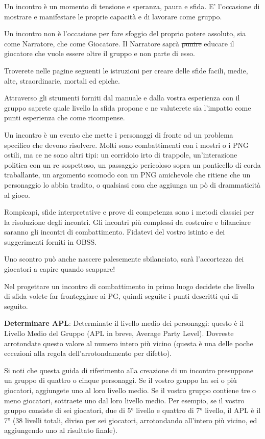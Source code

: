 \begin{multicols}{2}
\medskip

Un incontro è un momento di tensione e speranza, paura e sfida. E' l'occasione di mostrare e manifestare le proprie capacità e di lavorare come gruppo.

Un incontro non è l'occasione per fare sfoggio del proprio potere assoluto, sia come Narratore, che come Giocatore. Il Narratore saprà \st{punire} educare il giocatore che vuole essere oltre il gruppo e non parte di esso.

Troverete nelle pagine seguenti le istruzioni per creare delle sfide facili, medie, alte, straordinarie, mortali ed epiche.

Attraverso gli strumenti forniti dal manuale e dalla vostra esperienza con il gruppo saprete quale livello la sfida propone e ne valuterete sia l'impatto come punti esperienza che come ricompense.

Un incontro è un evento che mette i personaggi di fronte ad un problema specifico che devono risolvere. Molti sono combattimenti con i mostri o i PNG ostili, ma ce ne sono altri tipi: un corridoio irto di trappole, un'interazione politica con un re sospettoso, un passaggio pericoloso sopra un ponticello di corda traballante, un argomento scomodo con un PNG amichevole che ritiene che un personaggio lo abbia tradito, o qualsiasi cosa che aggiunga un pò di drammaticità al gioco.

Rompicapi, sfide interpretative e prove di competenza sono i metodi classici per la risoluzione degli incontri. Gli incontri più complessi da costruire e bilanciare saranno gli incontri di combattimento. Fidatevi del vostro istinto e dei suggerimenti forniti in OBSS.

Uno scontro può anche nascere palesemente sbilanciato, sarà l'accortezza dei giocatori a capire quando scappare!

Nel progettare un incontro di combattimento in primo luogo decidete che livello di sfida volete far fronteggiare ai PG, quindi seguite i punti descritti qui di seguito.

\textbf{Determinare APL}: Determinate il livello medio dei personaggi: questo è il Livello Medio del Gruppo (APL in breve, Average Party Level). Dovreste arrotondate questo valore al numero intero più vicino (questa è una delle poche eccezioni alla regola dell'arrotondamento per difetto).

Si noti che questa guida di riferimento alla creazione di un incontro presuppone un gruppo di quattro o cinque personaggi. Se il vostro gruppo ha sei o più giocatori, aggiungete uno al loro livello medio. Se il vostro gruppo contiene tre o meno giocatori, sottraete uno dal loro livello medio. Per esempio, se il vostro gruppo consiste di sei giocatori, due di 5° livello e quattro di 7° livello, il APL è il 7° (38 livelli totali, diviso per sei giocatori, arrotondando all'intero più vicino, ed aggiungendo uno al risultato finale).


\end{multicols}
